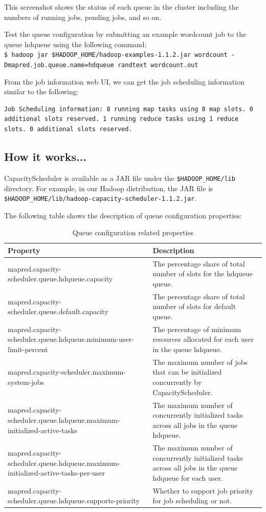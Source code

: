 
This screenshot shows the status of each queue in the cluster including the numbers of running jobs, pending jobs, and so on. 

Test the queue configuration by submitting an example wordcount job to the queue hdqueue using the following command: \\ 
\verb|$ hadoop jar $HADOOP_HOME/hadoop-examples-1.1.2.jar wordcount -Dmapred.job.queue.name=hdqueue randtext wordcount.out | 

From the job information web UI, we can get the job scheduling information similar to the following: 
\begin{verbatim}
Job Scheduling information: 8 running map tasks using 8 map slots. 0 additional slots reserved. 1 running reduce tasks using 1 reduce slots. 0 additional slots reserved.
\end{verbatim}

\subsection*{How it works...}
CapacityScheduler is available as a JAR file under the \verb|$HADOOP_HOME/lib| directory. For example, in our Hadoop distribution, the JAR file is \verb|$HADOOP_HOME/lib/hadoop-capacity-scheduler-1.1.2.jar|.

The following table shows the description of queue configuration properties: 

\begin{table}[h]
  \scriptsize
  \centering
  \begin{tabular}{p{}p{}}
    \toprule 
    \textbf{Property} & \textbf{Description} \\ \midrule
    mapred.capacity-scheduler.queue.hdqueue.capacity & The percentage share of total number of slots for the hdqueue queue. \\
    mapred.capacity-scheduler.queue.default.capacity & The percentage share of total number of slots for default queue.\\
    mapred.capacity-scheduler.queue.hdqueue.minimum-user-limit-percent & The percentage of minimum resources allocated for each user in the queue hdqueue. \\
    mapred.capacity-scheduler.maximum-system-jobs & The maximum number of jobs that can be initialized concurrently by CapacityScheduler. \\
    mapred.capacity-scheduler.queue.hdqueue.maximum-initialized-active-tasks & The maximum number of concurrently initialized tasks across all jobs in the queue hdqueue. \\
    mapred.capacity-scheduler.queue.hdqueue.maximum-initialized-active-tasks-per-user & The maximum number of concurrently initialized tasks across all jobs in the queue hdqueue for each user. \\
    mapred.capacity-scheduler.queue.hdqueue.supports-priority & Whether to support job priority for job scheduling or not. \\ \bottomrule
  \end{tabular}
  \caption{Queue configuration related properties}\label{tbl:queueconfig}
\end{table}

